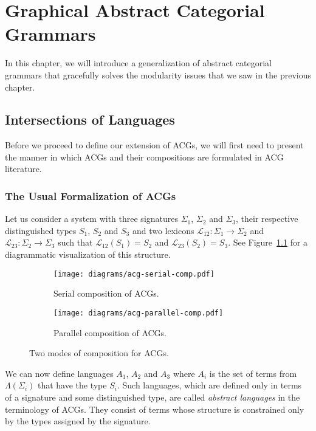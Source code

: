 \chapter{Graphical Abstract Categorial Grammars}
\label{chap:gacg}

In this chapter, we will introduce a generalization of abstract
categorial grammars that gracefully solves the modularity issues that we
saw in the previous chapter.

\section{Intersections of Languages}
\label{sec:sects-of-langs}

Before we proceed to define our extension of ACGs, we will first need to
present the manner in which ACGs and their compositions are formulated
in ACG literature.

\subsection{The Usual Formalization of ACGs}
\label{ssec:usual-acgs}

Let us consider a system with three signatures $\Sigma_1$, $\Sigma_2$
and $\Sigma_3$, their respective distinguished types $S_1$, $S_2$ and
$S_3$ and two lexicons $\mathcal{L}_{12} : \Sigma_1 \to \Sigma_2$ and
$\mathcal{L}_{23} : \Sigma_2 \to \Sigma_3$ such that
$\mathcal{L}_{12}(S_1) = S_2$ and $\mathcal{L}_{23}(S_2) = S_3$. See
Figure~\ref{fig:acg-serial-comp} for a diagrammatic visualization of
this structure.

\begin{figure}[t]
  \centering
  \begin{subfigure}[b]{0.4\textwidth}
    \centering
    \texttt{[image: diagrams/acg-serial-comp.pdf]}
    \caption{\label{fig:acg-serial-comp} Serial composition of ACGs.}
  \end{subfigure}
  \qquad
  \begin{subfigure}[b]{0.4\textwidth}
    \centering
    \texttt{[image: diagrams/acg-parallel-comp.pdf]}
    \caption{\label{fig:acg-parallel-comp} Parallel composition of ACGs.}
  \end{subfigure}
  \caption{\label{fig:acg-comp-modes} Two modes of composition for
    ACGs.}
\end{figure}

We can now define languages $A_1$, $A_2$ and $A_3$ where $A_i$ is the
set of terms from $\Lambda(\Sigma_i)$ that have the type $S_i$. Such
languages, which are defined only in terms of a signature and some
distinguished type, are called \emph{abstract languages} in the
terminology of ACGs. They consist of terms whose structure is
constrained only by the types assigned by the signature.

